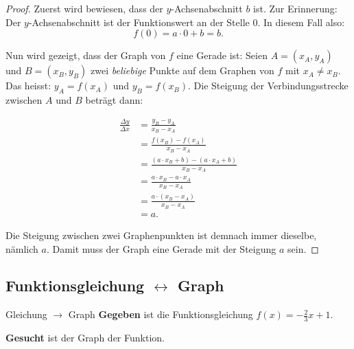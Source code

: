 \medskip
\begin{proof}

    Zuerst wird bewiesen, dass der \(y\)-Achsenabschnitt \(b\) ist.
    Zur Erinnerung: Der \(y\)-Achsenabschnitt ist der Funktionswert
    an der Stelle 0. In diesem Fall also:
    \[
        f(0)=a\cdot 0+b=b.
    \]

    Nun wird gezeigt, dass der Graph von \(f\) eine Gerade ist:
    Seien \(A=(x_A, y_A)\) und \(B=(x_B, y_B)\) zwei
    \emph{beliebige} Punkte auf dem Graphen von \(f\)
    mit \(x_A\neq x_B\).
    Das heisst: \(y_A=f(x_A)\) und \(y_B=f(x_B)\).
    Die Steigung der Verbindungsstrecke zwischen \(A\) und \(B\)
    beträgt dann:

    \begin{align*}
        \frac{\Delta y}{\Delta x}
         & = \frac{y_B-y_A}{x_B-x_A}               \\
         & = \frac{f(x_B)-f(x_A)}{x_B-x_A}         \\
         & = \frac{(a\cdot x_B+b)-(a\cdot x_A+b)}
             {x_B-x_A}   \\
         & = \frac{a\cdot x_B-a\cdot x_A}{x_B-x_A} \\
         & = \frac{a\cdot(x_B-x_A)}{x_B-x_A}       \\
         & = a.
    \end{align*}

    Die Steigung zwischen zwei Graphenpunkten ist demnach
    immer dieselbe, nämlich \(a\).
    Damit muss der Graph eine Gerade mit der Steigung \(a\) sein.
\end{proof}












\clearpage
\subsection{Funktionsgleichung \(\longleftrightarrow\) Graph}

\begin{bsp}
    {Gleichung \(\longrightarrow\) Graph}{}
    \textbf{Gegeben} ist die Funktionsgleichung
    \(
    f(x) = -\frac{2}{3}x + 1.
    \)

    \textbf{Gesucht} ist der Graph der Funktion.

    \karofeld{7.2cm}
\end{bsp}

